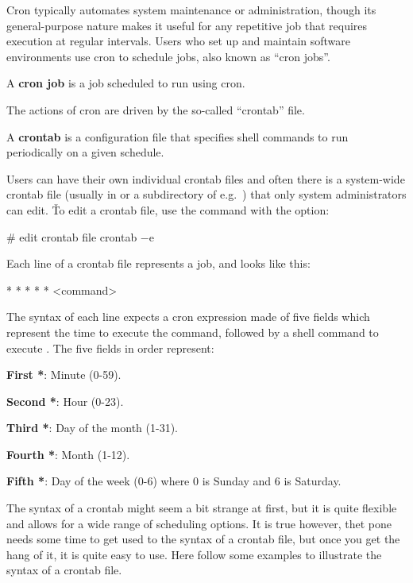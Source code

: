 Cron typically automates system maintenance or administration, though its general-purpose nature makes it useful for
any repetitive job that requires execution at regular intervals. Users who set up and maintain software environments
use cron to schedule jobs, also known as ``cron jobs''.

\label{def:cron_job}
A \textbf{cron job} is a job scheduled to run using cron.
\ed

The actions of cron are driven by the so-called ``crontab'' file.

\bd[Crontab]
A \textbf{crontab} is a configuration file that specifies shell commands to run periodically on a given schedule.
\ed

Users can have their own individual crontab files and often there is a system-wide crontab file (usually in 
or a subdirectory of   e.g.\ ) that only system administrators can edit. \v

To edit a crontab file, use the  command with the  option:
\begin{bash}
# edit crontab file
crontab $-$e
\end{bash}

Each line of a crontab file represents a job, and looks like this:
\begin{block}
* * * * * <command>
\end{block}

The syntax of each line expects a cron expression made of five fields \code{* * * * *} which represent the time to
execute the command, followed by a shell command to execute . The five fields in order
represent:
\bit
\item \textbf{First *}: Minute (0-59).
\item \textbf{Second *}: Hour (0-23).
\item \textbf{Third *}: Day of the month (1-31).
\item \textbf{Fourth *}: Month (1-12).
\item \textbf{Fifth *}: Day of the week (0-6) where 0 is Sunday and 6 is Saturday.
\eit

The syntax of a crontab might seem a bit strange at first, but it is quite flexible and allows for a wide range of
scheduling options. It is true however, thet pone needs some time to get used to the syntax of a crontab file, but
once you get the hang of it, it is quite easy to use. Here follow some examples to illustrate the syntax of a
crontab file.

